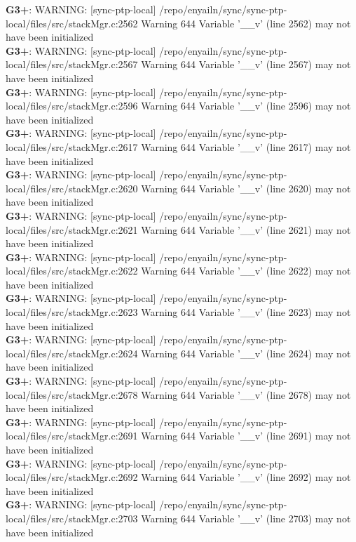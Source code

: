 \documentclass[12pt,twoside]{article}
\begin{document}
\textbf{G3+}: WARNING: [sync-ptp-local] /repo/enyailn/sync/sync-ptp-local/files/src/stackMgr.c:2562 Warning 644 Variable '\_\_v' (line 2562) may not have been initialized\\ 
\textbf{G3+}: WARNING: [sync-ptp-local] /repo/enyailn/sync/sync-ptp-local/files/src/stackMgr.c:2567 Warning 644 Variable '\_\_v' (line 2567) may not have been initialized\\ 
\textbf{G3+}: WARNING: [sync-ptp-local] /repo/enyailn/sync/sync-ptp-local/files/src/stackMgr.c:2596 Warning 644 Variable '\_\_v' (line 2596) may not have been initialized\\ 
\textbf{G3+}: WARNING: [sync-ptp-local] /repo/enyailn/sync/sync-ptp-local/files/src/stackMgr.c:2617 Warning 644 Variable '\_\_v' (line 2617) may not have been initialized\\ 
\textbf{G3+}: WARNING: [sync-ptp-local] /repo/enyailn/sync/sync-ptp-local/files/src/stackMgr.c:2620 Warning 644 Variable '\_\_v' (line 2620) may not have been initialized\\ 
\textbf{G3+}: WARNING: [sync-ptp-local] /repo/enyailn/sync/sync-ptp-local/files/src/stackMgr.c:2621 Warning 644 Variable '\_\_v' (line 2621) may not have been initialized\\ 
\textbf{G3+}: WARNING: [sync-ptp-local] /repo/enyailn/sync/sync-ptp-local/files/src/stackMgr.c:2622 Warning 644 Variable '\_\_v' (line 2622) may not have been initialized\\ 
\textbf{G3+}: WARNING: [sync-ptp-local] /repo/enyailn/sync/sync-ptp-local/files/src/stackMgr.c:2623 Warning 644 Variable '\_\_v' (line 2623) may not have been initialized\\ 
\textbf{G3+}: WARNING: [sync-ptp-local] /repo/enyailn/sync/sync-ptp-local/files/src/stackMgr.c:2624 Warning 644 Variable '\_\_v' (line 2624) may not have been initialized\\ 
\textbf{G3+}: WARNING: [sync-ptp-local] /repo/enyailn/sync/sync-ptp-local/files/src/stackMgr.c:2678 Warning 644 Variable '\_\_v' (line 2678) may not have been initialized\\ 
\textbf{G3+}: WARNING: [sync-ptp-local] /repo/enyailn/sync/sync-ptp-local/files/src/stackMgr.c:2691 Warning 644 Variable '\_\_v' (line 2691) may not have been initialized\\ 
\textbf{G3+}: WARNING: [sync-ptp-local] /repo/enyailn/sync/sync-ptp-local/files/src/stackMgr.c:2692 Warning 644 Variable '\_\_v' (line 2692) may not have been initialized\\ 
\textbf{G3+}: WARNING: [sync-ptp-local] /repo/enyailn/sync/sync-ptp-local/files/src/stackMgr.c:2703 Warning 644 Variable '\_\_v' (line 2703) may not have been initialized\\ 
\end{document}
